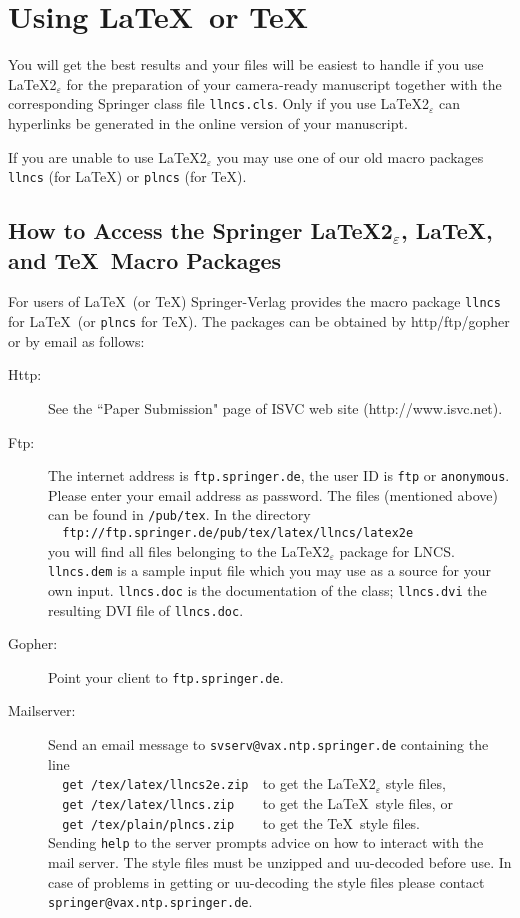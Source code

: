 \documentclass[runningheads]{llncs}
\begin{document}
\section{Using \LaTeX\ or \TeX}
\label{sect:TeX}

You will get the best results and your files will be easiest to handle
if you use \LaTeX2$_\varepsilon$ for the preparation of your
camera-ready manuscript
together with the corresponding Springer class file
\verb+llncs.cls+. Only if you use \LaTeX2$_\varepsilon$ can
hyperlinks be generated in the online version of your manuscript.

If you are unable to use \LaTeX2$_\varepsilon$ you may use one of our
old macro packages \verb+llncs+ (for \LaTeX) or \verb+plncs+ (for \TeX).


\subsection{How to Access the Springer \LaTeX2$_\varepsilon$,
\LaTeX,\\and \TeX\ Macro Packages}

For users of \LaTeX\ (or \TeX) Springer-Verlag provides the macro
package \verb+llncs+ for \LaTeX\ (or \verb+plncs+ for \TeX). The
packages can be obtained by http/ftp/gopher or by email as follows:

\begin{description}
\item[Http:]
See the ``Paper Submission" page of ISVC web site (http://www.isvc.net).
\item[Ftp:]
The internet address is \verb+ftp.springer.de+, the user ID is
\verb+ftp+ or \verb+anonymous+. Please enter your email address as
password. The files (mentioned above) can be found in \verb+/pub/tex+.
In the directory\\
\verb+  ftp://ftp.springer.de/pub/tex/latex/llncs/latex2e+\\
you will find all files belonging to the \LaTeX2$_\varepsilon$ package
for LNCS.
\verb+llncs.dem+ is a sample input file which you
may use as a source for your own input. \verb+llncs.doc+ is the
documentation of the class; \verb+llncs.dvi+ the resulting DVI file of
\verb+llncs.doc+.
\item[Gopher:]
Point your client to \verb+ftp.springer.de+.
\item[Mailserver:]
Send an email message to
\verb+svserv@vax.ntp.springer.de+  containing the line\\
\verb+  get /tex/latex/llncs2e.zip  +to get the
\LaTeX2$_\varepsilon$ style files,\\
\verb+  get /tex/latex/llncs.zip    +to get the \LaTeX\
style files, or\\
\verb+  get /tex/plain/plncs.zip    +to get the \TeX\
style files.\\
Sending \verb+help+ to the server prompts advice on how
to interact with the mail server. The style files must be unzipped and
uu-decoded before use. In case of problems in getting or uu-decoding the
style files please contact \verb+springer@vax.ntp.springer.de+.
\end{description}
\end{document}
